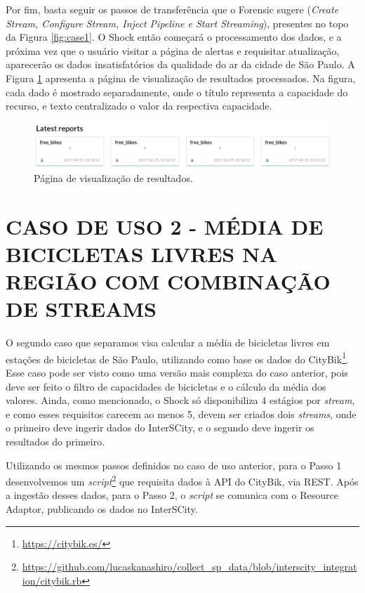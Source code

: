 Por fim, basta seguir os passos de transferência que o Forensic sugere (\textit{Create
Stream, Configure Stream, Inject Pipeline e Start Streaming}), presentes no
topo da Figura \ref{fig:case1}. O Shock então começará o processamento dos
dados, e a próxima vez que o usuário visitar a página de alertas e requisitar
atualização, aparecerão os dados insatisfatórios da qualidade do ar da cidade
de São Paulo. A Figura \ref{fig:reports} apresenta a página de visualização de
resultados processados. Na figura, cada dado é mostrado separadamente, onde o
título representa a capacidade do recurso, e texto centralizado o valor da
respectiva capacidade.

\begin{figure}[H]
  \centering
  \includegraphics[width=\textwidth]{figuras/latest-reports.png}
    \caption{Página de visualização de resultados.}
  \label{fig:reports}
\end{figure}


\section{CASO DE USO 2 - MÉDIA DE BICICLETAS LIVRES NA REGIÃO COM COMBINAÇÃO DE STREAMS}

O segundo caso que separamos visa calcular a média de bicicletas livres em estações
de bicicletas de São Paulo, utilizando como base os dados do
CityBik\footnote{\url{https://citybik.es/}}. Esse caso pode ser visto como uma
versão mais complexa do caso anterior, pois deve ser feito o filtro de
capacidades de bicicletas e o cálculo da média dos valores. Ainda,
como mencionado, o Shock só disponibiliza 4 estágios por
\textit{stream}, e como esses requisitos carecem ao menos 5, devem ser criados
dois \textit{streams}, onde o primeiro deve ingerir dados do InterSCity, e o
segundo deve ingerir os resultados do primeiro.

Utilizando os mesmos passos definidos no caso de uso anterior, para o Passo 1
desenvolvemos um
\textit{script}\footnote{\url{https://github.com/lucaskanashiro/collect_sp_data/blob/interscity_integration/citybik.rb}}
que requisita dados à API do CityBik, via REST. Após a ingestão desses dados,
para o Passo 2, o \textit{script} se comunica com o Resource Adaptor,
publicando os dados no InterSCity.

